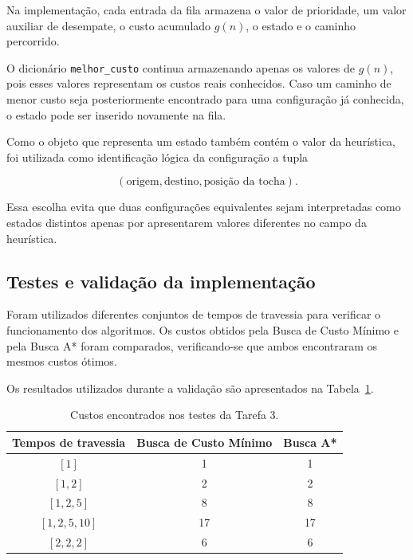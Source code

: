 \documentclass[12pt,a4paper]{article}
\begin{document}
Na implementação, cada entrada da fila armazena o valor de prioridade, um
valor auxiliar de desempate, o custo acumulado $g(n)$, o estado e o caminho
percorrido.

O dicionário \texttt{melhor\_custo} continua armazenando apenas os valores de
$g(n)$, pois esses valores representam os custos reais conhecidos. Caso um
caminho de menor custo seja posteriormente encontrado para uma configuração já
conhecida, o estado pode ser inserido novamente na fila.

Como o objeto que representa um estado também contém o valor da heurística,
foi utilizada como identificação lógica da configuração a tupla

\[
(\text{origem},\text{destino},\text{posição da tocha}).
\]

Essa escolha evita que duas configurações equivalentes sejam interpretadas
como estados distintos apenas por apresentarem valores diferentes no campo da
heurística.




\subsection{Testes e validação da implementação}

Foram utilizados diferentes conjuntos de tempos de travessia para verificar o
funcionamento dos algoritmos. Os custos obtidos pela Busca de Custo Mínimo e
pela Busca A* foram comparados, verificando-se que ambos encontraram os mesmos
custos ótimos.

Os resultados utilizados durante a validação são apresentados na
Tabela~\ref{tab:testes-tarefa3}.

\begin{table}[H]
    \centering
    \caption{Custos encontrados nos testes da Tarefa 3.}
    \label{tab:testes-tarefa3}
    \begin{tabular}{ccc}
        \toprule
        Tempos de travessia & Busca de Custo Mínimo & Busca A* \\
        \midrule
        $[1]$ & 1 & 1 \\
        $[1,2]$ & 2 & 2 \\
        $[1,2,5]$ & 8 & 8 \\
        $[1,2,5,10]$ & 17 & 17 \\
        $[2,2,2]$ & 6 & 6 \\
        \bottomrule
    \end{tabular}
\end{table}
\end{document}
